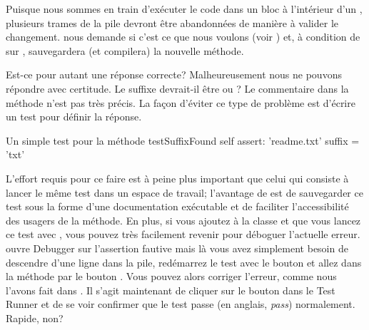 \documentclass[a4paper,10pt,twoside]{book}
\begin{document}
Puisque nous sommes en train d'exécuter le code dans un bloc à
l'intérieur d'un , plusieurs trames de la pile 
devront être abandonnées de manière à valider le changement.
\pharo nous demande si c'est ce que nous voulons (voir )
et, à condition de \click{} sur , \pharo sauvegardera
(et compilera) la nouvelle méthode.



Est-ce pour autant une réponse correcte?  Malheureusement nous ne pouvons
répondre avec certitude.
Le suffixe devrait-il être  ou ?
Le commentaire dans la méthode  n'est pas très précis.
La façon d'éviter ce type de problème est d'écrire
un test  pour définir la réponse.

\begin{method}[testSuffix]{Un simple test pour la méthode }
testSuffixFound
	self assert: 'readme.txt' suffix = 'txt'
\end{method}

L'effort requis pour ce faire est à peine plus important que celui
qui consiste à lancer le même test dans un espace de travail;
l'avantage de \sunit est de sauvegarder ce test sous la forme d'une
documentation exécutable et de faciliter l'accessibilité des usagers
de la méthode.
En plus, si vous ajoutez  à la classe
 et que vous lancez ce test avec \sunit, vous
pouvez très facilement revenir pour déboguer l'actuelle erreur.
\sunit ouvre Debugger sur l'assertion fautive mais là vous
avez simplement besoin de descendre d'une ligne dans la pile,
redémarrez le test avec le bouton  et allez
dans la méthode  par le bouton . Vous
pouvez alors corriger l'erreur, comme nous l'avons fait dans
.
Il s'agit maintenant de cliquer sur le bouton  dans
le \sunit Test Runner et de se voir confirmer que le test passe (en anglais, \emph{pass}) 
normalement. Rapide, non?
\end{document}
